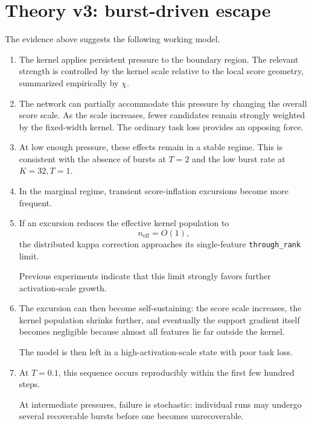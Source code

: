 \documentclass[11pt,a4paper]{article}
\newcommand{\code}[1]{\texttt{#1}}
\newcommand{\neff}{n_{\mathrm{eff}}}
\begin{document}
\section{Theory v3: burst-driven escape}

The evidence above suggests the following working model.

\begin{enumerate}[leftmargin=1.6em]

\item
The kernel applies persistent pressure to the boundary region.
The relevant strength is controlled by the kernel scale relative to the local
score geometry, summarized empirically by \(\chi\).

\item
The network can partially accommodate this pressure by changing the overall
score scale.
As the scale increases, fewer candidates remain strongly weighted by the
fixed-width kernel.
The ordinary task loss provides an opposing force.

\item
At low enough pressure, these effects remain in a stable regime.
This is consistent with the absence of bursts at \(T=2\) and the low burst
rate at \(K=32,T=1\).

\item
In the marginal regime, transient score-inflation excursions become more
frequent.

\item
If an excursion reduces the effective kernel population to
\[
\neff=O(1),
\]
the distributed kappa correction approaches its single-feature
\code{through\_rank} limit.

Previous experiments indicate that this limit strongly favors further
activation-scale growth.

\item
The excursion can then become self-sustaining:
the score scale increases, the kernel population shrinks further, and
eventually the support gradient itself becomes negligible because almost all
features lie far outside the kernel.

The model is then left in a high-activation-scale state with poor task loss.

\item
At \(T=0.1\), this sequence occurs reproducibly within the first few hundred
steps.

At intermediate pressures, failure is stochastic:
individual runs may undergo several recoverable bursts before one becomes
unrecoverable.

\end{enumerate}
\end{document}
